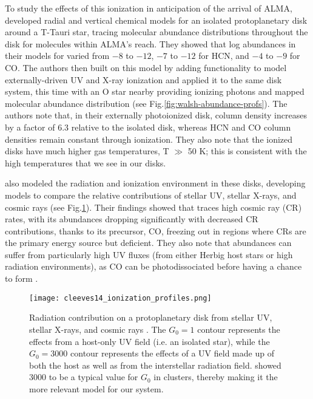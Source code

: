 To study the effects of this ionization in anticipation of the arrival of ALMA, \citet{Walsh2010} developed radial and vertical chemical models for an isolated protoplanetary disk around a T-Tauri star, tracing molecular abundance distributions throughout the disk for molecules within ALMA's reach. They showed that log abundances in their models for \hco varied from $-8$ to $-12$, $-7$ to $-12$ for HCN, and $-4$ to $-9$ for CO. The authors then built on this model by adding functionality to model externally-driven UV and X-ray ionization \citep{Walsh2012} and applied it to the same disk system, this time with an O star nearby providing ionizing photons \citep{Walsh2013} and mapped molecular abundance distribution (see Fig.\ref{fig:walsh-abundance-profs}). The authors note that, in their externally photoionized disk, \hco column density increases by a factor of 6.3 relative to the isolated disk, whereas HCN and CO column densities remain constant through ionization. They also note that the ionized disks have much higher gas temperatures, T $\gg$ 50 K; this is consistent with the high temperatures that we see in our disks.


\citet{Cleeves2013,Cleeves2014} also modeled the radiation and ionization environment in these disks, developing models to compare the relative contributions of stellar UV, stellar X-rays, and cosmic rays (see Fig.\ref{fig:disk_ionization}). Their findings showed that \hco traces high cosmic ray (CR) rates, with its abundances dropping significantly with decreased CR contributions, thanks to its precursor, CO, freezing out in regions where CRs are the primary energy source but deficient. They also note that \hco abundances can suffer from particularly high UV fluxes (from either Herbig host stars or high radiation environments), as CO can be photodissociated before having a chance to form \hco. %




\begin{figure}[t]
  \texttt{[image: cleeves14\_ionization\_profiles.png]}%
  \caption{Radiation contribution on a protoplanetary disk from stellar UV, stellar X-rays, and cosmic rays \citep{Cleeves2013}. The $G_0 = 1$ contour represents the effects from a host-only UV field (i.e. an isolated star), while the $G_0 = 3000$ contour represents the effects of a UV field made up of both the host as well as from the interstellar radiation field. \cite{Fatuzzo2008} showed 3000 to be a typical value for $G_0$ in clusters, thereby making it the more relevant model for our system.}
  \label{fig:disk_ionization}
\end{figure}



